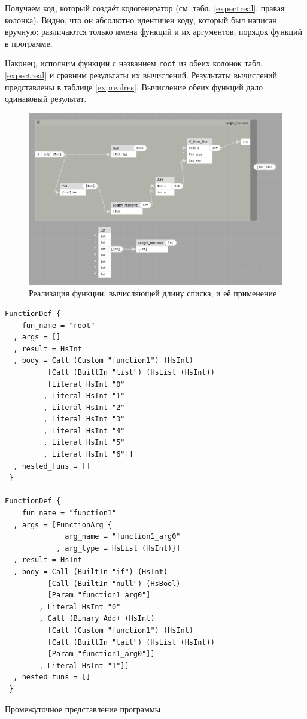 Получаем код, который создаёт кодогенератор (см. табл. \ref{expectreal}, правая колонка). Видно, что он абсолютно идентичен коду, который был написан вручную: различаются только имена функций и их аргументов, порядок функций в программе.

Наконец, исполним функции с названием \lstinline!root! из обеих колонок табл. \ref{expectreal} и сравним результаты их вычислений. Результаты вычислений представлены в таблице \ref{exprealres}. Вычисление обеих функций дало одинаковый результат.

\begin{figure}[p]
\centering
\includegraphics[width=\textwidth]{img/length.PNG}
\caption{Реализация функции, вычисляющей длину списка, и её применение} \label{lengthrec}	
\end{figure}

\begin{ListingEnv}[h]
\begin{lstlisting}
FunctionDef {
    fun_name = "root"
  , args = []
  , result = HsInt
  , body = Call (Custom "function1") (HsInt) 
          [Call (BuiltIn "list") (HsList (HsInt)) 
          [Literal HsInt "0"
         , Literal HsInt "1"
         , Literal HsInt "2"
         , Literal HsInt "3"
         , Literal HsInt "4"
         , Literal HsInt "5"
         , Literal HsInt "6"]]
  , nested_funs = []
 }
 
FunctionDef {
    fun_name = "function1"
  , args = [FunctionArg {
              arg_name = "function1_arg0"
            , arg_type = HsList (HsInt)}]
  , result = HsInt
  , body = Call (BuiltIn "if") (HsInt) 
          [Call (BuiltIn "null") (HsBool) 
          [Param "function1_arg0"]
        , Literal HsInt "0"
        , Call (Binary Add) (HsInt) 
          [Call (Custom "function1") (HsInt) 
          [Call (BuiltIn "tail") (HsList (HsInt)) 
          [Param "function1_arg0"]]
        , Literal HsInt "1"]]
  , nested_funs = []
 }
\end{lstlisting}
\caption{Промежуточное представление программы}\label{intermed}
\end{ListingEnv}

